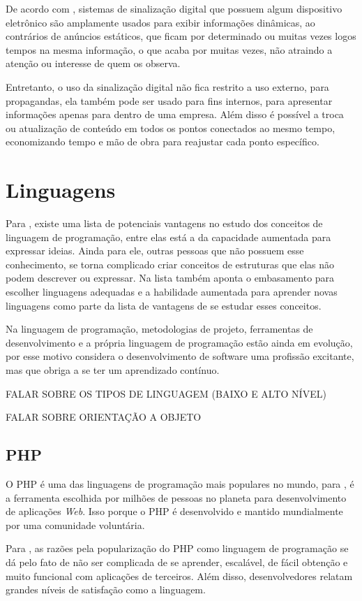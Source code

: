 De acordo com \cite{mishima2016}, sistemas de sinalização
digital que possuem algum dispositivo eletrônico são amplamente usados para exibir informações dinâmicas, ao contrários de anúncios estáticos, que ficam por determinado ou muitas vezes logos tempos na mesma informação, o que acaba por muitas vezes, não atraindo a atenção ou interesse de quem os observa.

Entretanto, o uso da sinalização digital não fica restrito a uso externo, para propagandas, ela também pode ser usado para fins internos, para apresentar informações apenas para dentro de uma empresa. Além disso é possível a troca ou atualização de conteúdo em todos os pontos conectados ao mesmo tempo, economizando tempo e mão de obra para reajustar cada ponto específico.

\section{Linguagens}
Para \cite{sebesta2011}, existe uma lista de potenciais vantagens no estudo dos conceitos de linguagem de programação, entre elas está a da capacidade aumentada para expressar ideias. Ainda para ele, outras pessoas que não possuem esse conhecimento, se torna complicado criar conceitos de estruturas que elas não podem descrever ou expressar. Na lista também aponta o embasamento para escolher linguagens adequadas e a habilidade aumentada para aprender novas linguagens como parte da lista de vantagens de se estudar esses conceitos.

Na linguagem de programação, metodologias de projeto, ferramentas de desenvolvimento e a própria linguagem de programação estão ainda em evolução, por esse motivo \cite{sebesta2011} considera o desenvolvimento de software uma profissão excitante, mas que obriga a se ter um aprendizado contínuo.

FALAR SOBRE OS TIPOS DE LINGUAGEM (BAIXO E ALTO NÍVEL)

FALAR SOBRE ORIENTAÇÃO A OBJETO

\subsection{PHP}
O PHP é uma das linguagens de programação mais populares no mundo, para \cite[p.2]{vaswani2010}, é a ferramenta  escolhida por milhões de pessoas no planeta para desenvolvimento de aplicações \textit{Web}. Isso porque o PHP é desenvolvido e mantido mundialmente por uma comunidade voluntária. 

Para \cite[p.2]{vaswani2010}, as razões pela popularização do PHP como linguagem de programação se dá pelo fato de não ser complicada de se aprender, escalável, de fácil obtenção e muito funcional com aplicações de terceiros. Além disso, desenvolvedores relatam grandes níveis de satisfação como a linguagem.

